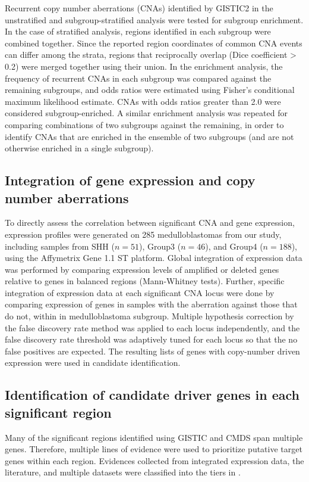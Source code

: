 Recurrent copy number aberrations (CNAs) identified by GISTIC2 in the unstratified and subgroup-stratified analysis were tested for subgroup enrichment. In the case of stratified analysis, regions identified in each subgroup were combined together. Since the reported region coordinates of common CNA events can differ among the strata, regions that reciprocally overlap (Dice coefficient > 0.2) were merged together using their union. In the enrichment analysis, the frequency of recurrent CNAs in each subgroup was compared against the remaining subgroups, and odds ratios were estimated using Fisher’s conditional maximum likelihood estimate. CNAs with odds ratios greater than 2.0 were considered subgroup-enriched. A similar enrichment analysis was repeated for comparing combinations of two subgroups against the remaining, in order to identify CNAs that are enriched in the ensemble of two subgroups (and are not otherwise enriched in a single subgroup).

\subsection{Integration of gene expression and copy number aberrations}

To directly assess the correlation between significant CNA and gene expression, expression profiles were generated on 285 medulloblastomas from our study, including samples from SHH ($n = 51$), Group3 ($n = 46$), and Group4 ($n = 188$), using the Affymetrix Gene 1.1 ST platform. Global integration of expression data was performed by comparing expression levels of amplified or deleted genes relative to genes in balanced regions (Mann-Whitney tests). Further, specific integration of expression data at each significant CNA locus were done by comparing expression of genes in samples with the aberration against those that do not, within in medulloblastoma subgroup. Multiple hypothesis correction by the false discovery rate method was applied to each locus independently, and the false discovery rate threshold was adaptively tuned for each locus so that the no false positives are expected. The resulting lists of genes with copy-number driven expression were used in candidate identification.

\subsection{Identification of candidate driver genes in each significant region}

Many of the significant regions identified using GISTIC and CMDS span multiple genes. Therefore, multiple lines of evidence were used to prioritize putative target genes within each region. Evidences collected from integrated expression data, the literature, and multiple datasets were classified into the tiers in .

